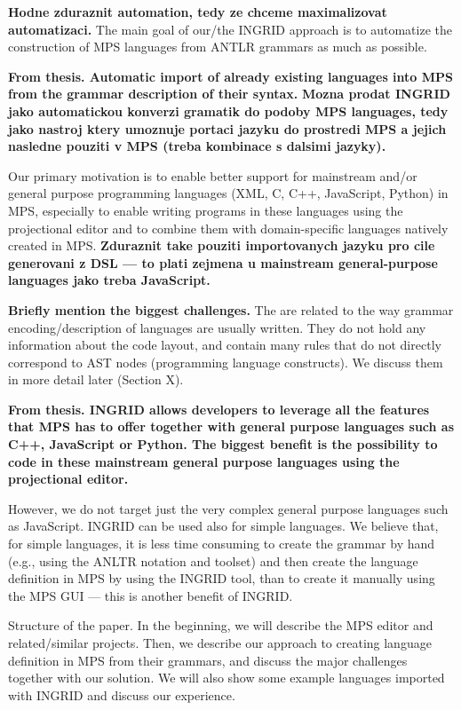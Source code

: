 \documentclass[10pt]{sigplanconf}
\newcommand{\todo}[1]{{\bfseries #1}}
\begin{document}
\todo{Hodne zduraznit automation, tedy ze chceme maximalizovat automatizaci.}
The main goal of our/the INGRID approach is to automatize the construction of MPS languages from ANTLR grammars as much as possible.

\todo{From thesis.
	Automatic import of already existing languages into MPS from the grammar description of their syntax.
}
\todo{Mozna prodat INGRID jako automatickou konverzi gramatik do podoby MPS languages, tedy jako nastroj ktery umoznuje portaci jazyku do prostredi MPS a jejich nasledne pouziti v MPS (treba kombinace s dalsimi jazyky).}

Our primary motivation is to enable better support for mainstream and/or general purpose programming languages (XML, C, C++, JavaScript, Python) in MPS, especially to enable writing programs in these languages using the projectional editor and to combine them with domain-specific languages natively created in MPS.
\todo{Zduraznit take pouziti importovanych jazyku pro cile generovani z DSL --- to plati zejmena u mainstream general-purpose languages jako treba JavaScript.}

\todo{Briefly mention the biggest challenges.}
The are related to the way grammar encoding/description of languages are usually written.
They do not hold any information about the code layout, and contain many rules that do not directly correspond to AST nodes (programming language constructs).
We discuss them in more detail later (Section X).

\todo{From thesis.
	INGRID allows developers to leverage all the features that MPS has to offer together with general purpose languages such as C++, JavaScript or Python.
	The biggest benefit is the possibility to code in these mainstream general purpose languages using the projectional editor.
}

However, we do not target just the very complex general purpose languages such as JavaScript.
INGRID can be used also for simple languages.
We believe that, for simple languages, it is less time consuming to create the grammar by hand (e.g., using the ANLTR notation and toolset) and then create the language definition in MPS by using the INGRID tool, than to create it manually using the MPS GUI --- this is another benefit of INGRID.

Structure of the paper.
In the beginning, we will describe the MPS editor and related/similar projects.
Then, we describe our approach to creating language definition in MPS from their grammars, and discuss the major challenges together with our solution.
We will also show some example languages imported with INGRID and discuss our experience.
\end{document}
